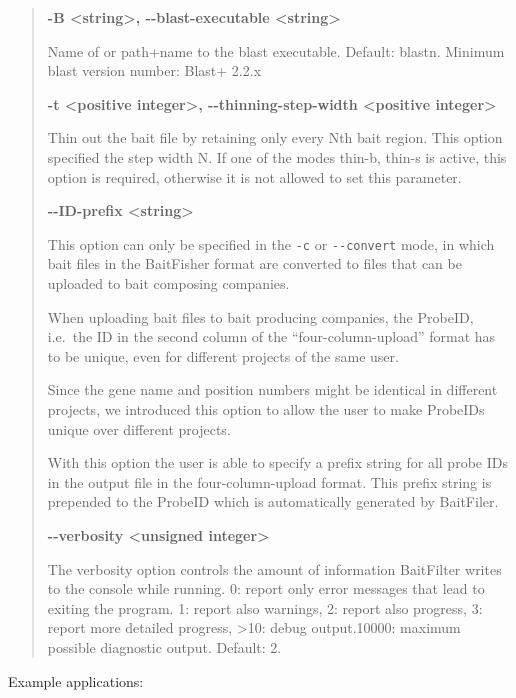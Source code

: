 \documentclass[a4paper,pdflatex,11pt]{article}
\begin{document}
\begin{quote}
\textbf{-B \textless string\textgreater , -\/-blast-executable
\textless string\textgreater }

Name of or path+name to the blast executable. Default: blastn. Minimum
blast version number: Blast+ 2.2.x

\textbf{-t \textless positive integer\textgreater ,
-\/-thinning-step-width \textless positive integer\textgreater }

Thin out the bait file by retaining only every Nth bait region. This
option specified the step width N. If one of the modes thin-b, thin-s is
active, this option is required, otherwise it is not allowed to set this
parameter.

\textbf{-\/-ID-prefix \textless string\textgreater }

This option can only be specified in the \verb+-c+ or \verb+--convert+ mode,
in which bait files in the BaitFisher format
are converted to files that can be uploaded to bait composing companies.

When uploading bait files to bait producing companies,
the ProbeID, i.e.\ the ID in the second column of the ``four-column-upload'' format
has to be unique, even for different projects of the same user.

Since the gene name and position numbers might be identical in different projects,
we introduced this option to allow the user to make ProbeIDs unique over
different projects.

With this option the user is able to specify a
prefix string for all probe IDs in the output file in the four-column-upload format.
This prefix string is prepended to the ProbeID which is automatically generated by BaitFiler.

\textbf{-\/-verbosity \textless unsigned integer\textgreater }

The verbosity option controls the amount of information BaitFilter
writes to the console while running. 0: report only error messages that
lead to exiting the program.
1: report also warnings, 2: report also progress, 3: report more
detailed progress, \textgreater 10: debug output.10000: maximum
possible diagnostic output. Default: 2.
\end{quote}

Example applications:
\end{document}
